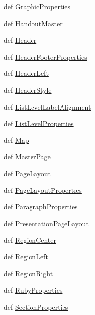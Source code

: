 \begin{DoxyCompactItemize}
def \hyperlink{namespaceodf_1_1style_a2da980beff962eab0c04ffdef5bb7f0f}{Graphic\+Properties}
\item 
def \hyperlink{namespaceodf_1_1style_a4a5bb916ea6a552b491c6b6de8bdf1ee}{Handout\+Master}
\item 
def \hyperlink{namespaceodf_1_1style_ad2eb3a6228fb45d0e15696713a6fbb38}{Header}
\item 
def \hyperlink{namespaceodf_1_1style_a77f408e9a87473b7caa96ab0a325893c}{Header\+Footer\+Properties}
\item 
def \hyperlink{namespaceodf_1_1style_ad499755cdce71d2ee2075c81b16faee8}{Header\+Left}
\item 
def \hyperlink{namespaceodf_1_1style_ad12e0a697e3569d4adff2354a82ab8b1}{Header\+Style}
\item 
def \hyperlink{namespaceodf_1_1style_a2620a558f842ba0409f0b4f56d00c3da}{List\+Level\+Label\+Alignment}
\item 
def \hyperlink{namespaceodf_1_1style_aa4af3e761b7d1f80e61cbd0a63aa17b1}{List\+Level\+Properties}
\item 
def \hyperlink{namespaceodf_1_1style_a2bae0805b58f6f34100dca97c8d3c67b}{Map}
\item 
def \hyperlink{namespaceodf_1_1style_a40f13519236d211e9e181eeedebf676c}{Master\+Page}
\item 
def \hyperlink{namespaceodf_1_1style_ad808b127a2e2ab94849c92f660d76e7f}{Page\+Layout}
\item 
def \hyperlink{namespaceodf_1_1style_a247d1100dbd80c50a208c312a3d4dd5e}{Page\+Layout\+Properties}
\item 
def \hyperlink{namespaceodf_1_1style_aade15817cae4b12d898031ecf72c3203}{Paragraph\+Properties}
\item 
def \hyperlink{namespaceodf_1_1style_a82ec1a21b4b7acef2322854f4e9617ff}{Presentation\+Page\+Layout}
\item 
def \hyperlink{namespaceodf_1_1style_a26917541bab7c1c5defc2adedd22953b}{Region\+Center}
\item 
def \hyperlink{namespaceodf_1_1style_ad0b82e704577cbd5ee04ec6176a9ed02}{Region\+Left}
\item 
def \hyperlink{namespaceodf_1_1style_a4511768243558fef5b12a73d419e920c}{Region\+Right}
\item 
def \hyperlink{namespaceodf_1_1style_afd33c4113b8f64734f09d3d5920a235a}{Ruby\+Properties}
\item 
def \hyperlink{namespaceodf_1_1style_aa5da7dc9556998395fff5278c51b014c}{Section\+Properties}
\item 

\end{DoxyCompactItemize}
